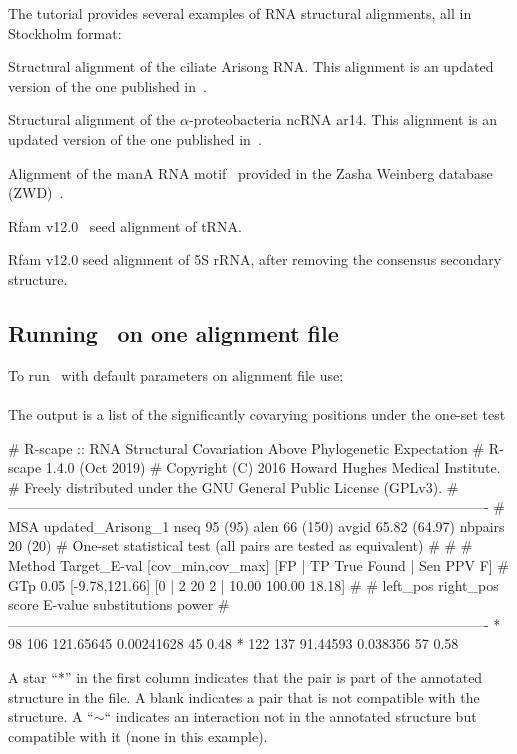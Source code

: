 The tutorial provides several examples of RNA structural
alignments, all in Stockholm format:

\begin{sreitems}{}
\item[\emprog{updated\_Arisong.sto}] Structural alignment of the ciliate
  Arisong RNA. This alignment is an updated
  version of the one published in~\citep{JungEddy11}.
\item[\emprog{ar14.sto}] Structural alignment of the $\alpha$-proteobacteria ncRNA ar14. This alignment is an updated version of the one
  published in~\citep{delVal12}.
\item[\emprog{manA.sto}] Alignment of the manA RNA motif~\citep{Weinberg09,Weinberg10} provided in the Zasha Weinberg database (ZWD)~\citep{ZWD18}.
\item[\emprog{RF00005.sto}] Rfam v12.0~\citep{Nawrocki15} seed alignment of tRNA. 
\item[\emprog{RF00001-noss.sto}] Rfam v12.0 seed alignment of 5S rRNA, after removing the consensus secondary structure. 
\end{sreitems}


\subsection{Running \rscape\, on one alignment file}
To run \rscape\ with default parameters on alignment file
 use:\\

\\

\noindent
The output is a list of the significantly covarying positions under the one-set test

\begin{sreoutput}
# R-scape :: RNA Structural Covariation Above Phylogenetic Expectation
# R-scape 1.4.0 (Oct 2019)
# Copyright (C) 2016 Howard Hughes Medical Institute.
# Freely distributed under the GNU General Public License (GPLv3).
#-------------------------------------------------------------------------------------------------------
# MSA updated_Arisong_1 nseq 95 (95) alen 66 (150) avgid 65.82 (64.97) nbpairs 20 (20)
# One-set statistical test (all pairs are tested as equivalent) 
#
#
# Method Target_E-val [cov_min,cov_max] [FP | TP True Found | Sen PPV F] 
# GTp    0.05         [-9.78,121.66]     [0 | 2 20 2 | 10.00 100.00 18.18] 
#
#       left_pos       right_pos        score          E-value       substitutions      power
#-------------------------------------------------------------------------------------------------------
*	      98	     106	121.65645	0.00241628	45		0.48
*	     122	     137	91.44593	0.038356	57		0.58
\end{sreoutput}
A star ``*'' in the first column indicates that the pair is part of
the annotated structure in the  file. A
blank indicates a pair that is not compatible with the structure. A
``$\sim$`` indicates an interaction not in the annotated structure but
compatible with it (none in this example).


